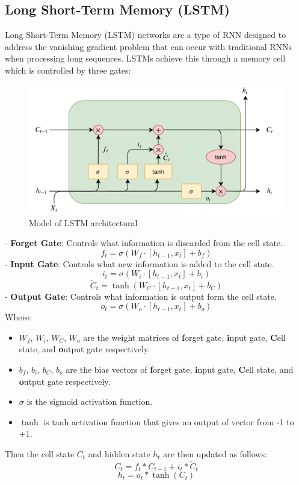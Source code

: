 \documentclass{ieeeojies}
\begin{document}
\subsection{Long Short-Term Memory (LSTM)}
Long Short-Term Memory (LSTM) networks are a type of RNN designed to address the vanishing gradient problem that can occur with traditional RNNs when processing long sequences. LSTMs achieve this through a memory cell which is controlled by three gates:\\
\begin{figure}[H]
    \centering
    \includegraphics[width=0.8\linewidth]{./image/LSTM.png}
    \caption{Model of LSTM architectural}
    \label{fig:8}
\end{figure}
- \textbf{Forget Gate}: Controls what information is discarded from the cell state.
\begin{dmath*}
    f_t = \sigma(W_f \cdot [h_{t-1}, x_t] + b_f)
\end{dmath*}
- \textbf{Input Gate}: Controls what new information is added to the cell state.
\begin{dmath*}
    i_t = \sigma(W_i \cdot [h_{t-1}, x_t] + b_i)
\end{dmath*}
\begin{dmath*}
    \tilde{C}_t = \tanh(W_C \cdot [h_{t-1}, x_t] + b_C)
\end{dmath*}
- \textbf{Output Gate}: Controls what information is output form the cell state.
\begin{dmath*}
    o_t = \sigma(W_o \cdot [h_{t-1}, x_t] + b_o)
\end{dmath*}
Where:
\begin{itemize}
    \item \(W_f\), \(W_i\), \(W_C\), \(W_o\) are the weight matrices of \textbf{f}orget gate, \textbf{i}nput gate, \textbf{C}ell state, and \textbf{o}utput gate respectively.
    \item \(b_f\), \(b_i\), \(b_C\), \(b_o\) are the bias vectors of  \textbf{f}orget gate, \textbf{i}nput gate, \textbf{C}ell state, and \textbf{o}utput gate respectively.
    \item \(\sigma\) is the sigmoid activation function.
    \item \(\tanh\) is tanh activation function that gives an output of vector from -1 to +1.
\end{itemize}
Then the cell state \(C_t\) and hidden state \(h_t\) are then updated as follows:
\begin{dmath*}
    C_t = f_t * C_{t-1} + i_t * \tilde{C}_t
\end{dmath*}
\begin{dmath*}
    h_t = o_t * \tanh(C_t)
\end{dmath*}
\end{document}
